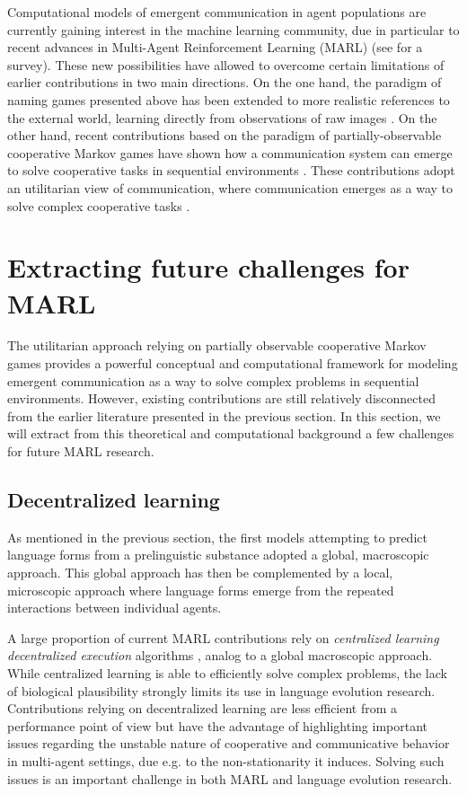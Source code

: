 \documentclass[letterpaper]{article} %
\begin{document}
Computational models of emergent communication in agent populations are currently gaining interest in the machine learning community, due in particular to recent advances in Multi-Agent Reinforcement Learning (MARL) (see \cite{hernandez2019survey} for a survey). These new possibilities have allowed to overcome certain limitations of earlier contributions in two main directions. On the one hand, the paradigm of naming games presented above has been extended to more realistic references to the external world, learning directly from observations of raw images \cite{Lazaridou2018}. On the other hand, recent contributions based on the paradigm of partially-observable cooperative Markov games \cite{Littman1994,Leibo2017c} have shown how a communication system can emerge to solve cooperative tasks in sequential environments \cite{Sukhbaatar2016,Mordatch2017,foerster2016learning}. These contributions adopt an utilitarian view of communication, where communication emerges as a way to solve complex cooperative tasks \cite{Gauthier2016}. 


\section{Extracting future challenges for MARL}

The utilitarian approach relying on partially observable cooperative Markov games provides a powerful conceptual and computational framework for modeling emergent communication as a way to solve complex problems in sequential environments. However, existing contributions are still relatively disconnected from the earlier literature presented in the previous section. In this section, we will extract from this theoretical and computational background a few challenges for future MARL research.


\subsection{Decentralized learning}
As mentioned in the previous section, the first models attempting to predict language forms from a prelinguistic substance adopted a global, macroscopic approach. This global approach has then be complemented by a local, microscopic approach where language forms emerge from the repeated interactions between individual agents.

A large proportion of current MARL contributions rely on \textit{centralized learning decentralized execution} algorithms \cite{Sukhbaatar2016,Mordatch2017,foerster2016learning}, analog to a global macroscopic approach. While centralized learning is able to efficiently solve complex problems, the lack of biological plausibility strongly limits its use in language evolution research. Contributions relying on decentralized learning \cite{anonymous2019intrinsic} are less efficient from a performance point of view but have the advantage of highlighting important issues regarding the unstable nature of cooperative and communicative behavior in multi-agent settings, due e.g. to the non-stationarity it induces. Solving such issues is an important challenge in both MARL and language evolution research.  
\end{document}

